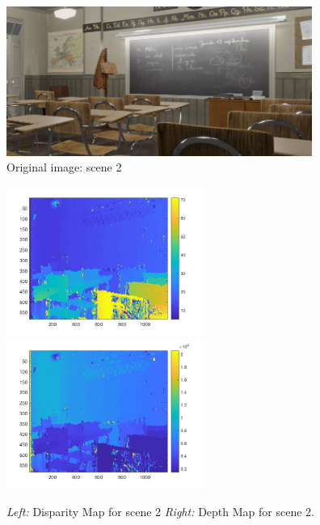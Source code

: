 \begin{figure}[H]
    \centering
    \includegraphics[width=10cm]{scene2_original.jpg}
    \caption{Original image: scene 2}
    \label{fig:scene2_original}
\end{figure}
\begin{figure}[H]
    \centering
    \includegraphics[width=6.5cm]{scene2_disparity.jpg}
    \includegraphics[width=6.5cm]{scene2_depth.jpg}
    \caption{\emph{Left:} Disparity Map for scene 2 \emph{Right:} Depth Map for scene 2.}
    \label{fig:scene2_depth_disparity}
\end{figure}

